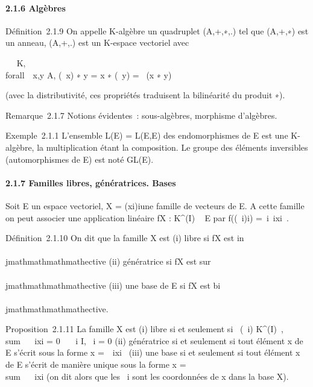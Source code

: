 \paragraph{2.1.6 Algèbres}

Définition~2.1.9 On appelle K-algèbre un quadruplet (A,+,∗,.) tel que
(A,+,∗) est un anneau, (A,+,.) est un K-espace vectoriel avec

\forall~\lambda~ \in K, \\forall~~x,y \in A,
(\lambda~x) ∗ y = x ∗ (\lambda~y) = \lambda~(x ∗ y)

(avec la distributivité, ces propriétés traduisent la bilinéarité du
produit ∗).

Remarque~2.1.7 Notions évidentes~: sous-algèbres, morphisme d'algèbres.

Exemple~2.1.1 L'ensemble L(E) = L(E,E) des endomorphismes de E est une
K-algèbre, la multiplication étant la composition. Le groupe des
éléments inversibles (automorphismes de E) est noté GL(E).

\paragraph{2.1.7 Familles libres, génératrices. Bases}

Soit E un espace vectoriel, X = (xi)i\inI une famille
de vecteurs de E. A cette famille on peut associer une application
linéaire fX : K^(I) \rightarrow~ E par
f((\alpha~i)i\inI) =\
\sum  i\inI\alpha~ixi~.

Définition~2.1.10 On dit que la famille X est (i) libre si fX
est in\\\\jmathmathmathmathective (ii) génératrice si fX est sur\\\\jmathmathmathmathective (iii) une
base de E si fX est bi\\\\jmathmathmathmathective.

Proposition~2.1.11 La famille X est (i) libre si et seulement si
\forall~(\alpha~i) \in K^(I)~,
\\sum ~
\alpha~ixi = 0 \rigtharrow~\forall~~i \in I,
\alpha~i = 0 (ii) génératrice si et seulement si tout élément x de E
s'écrit sous la forme x =\
\sum  \alpha~ixi~ (iii) une base
si et seulement si tout élément x de E s'écrit de manière unique sous la
forme x = \\sum ~
\alpha~ixi (on dit alors que les \alpha~i sont les
coordonnées de x dans la base X).


